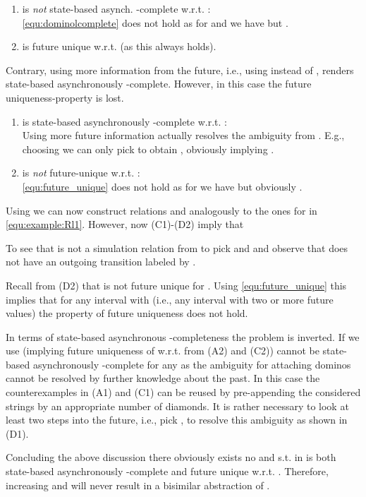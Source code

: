  \begin{enumerate}[(C1)]
\item  is \emph{not} state-based asynch. -complete w.r.t. :\\
\eqref{equ:dominolcomplete} does not hold as for  and  we have  but . \item  is future unique w.r.t.  (as this always holds). 
\end{enumerate}

\noindent Contrary, using more information from the future, i.e., using  instead of , renders  state-based asynchronously -complete. However, in this case the future uniqueness-property is lost.

 \begin{enumerate}[(D1)]
\item  is state-based asynchronously -complete w.r.t. :\\
 Using more future information actually resolves the ambiguity from . E.g., choosing  we can only pick  to obtain , obviously implying .
\item  is \emph{not} future-unique w.r.t. :\\
\eqref{equ:future_unique} does not hold as for  we have  but obviously . 
\end{enumerate}

\noindent Using  we can now construct relations  and  analogously to the ones for  in \eqref{equ:example:Rl1}. However, now (C1)-(D2) imply that 


\noindent To see that  is not a simulation relation from  to  pick  and  and observe that  does not have an outgoing transition labeled by .

Recall from (D2) that  is not future unique for . Using \eqref{equ:future_unique} this implies that for any interval  with  (i.e., any interval with two or more future values) the property of future uniqueness does not hold. 

In terms of state-based asynchronous -completeness the problem is inverted. If we use  (implying future uniqueness of  w.r.t.  from (A2) and (C2))  cannot be state-based asynchronously -complete for any  as the ambiguity for attaching dominos cannot be resolved by further knowledge about the past. In this case the counterexamples in (A1) and (C1) can be reused by pre-appending the considered strings by an appropriate number of diamonds. It is rather necessary to look at least two steps into the future, i.e., pick , to resolve this ambiguity as shown in (D1). 

Concluding the above discussion there obviously exists no  and  s.t.  in  is both state-based asynchronously -complete and future unique w.r.t. . Therefore, increasing  and  will never result in a bisimilar abstraction of .









